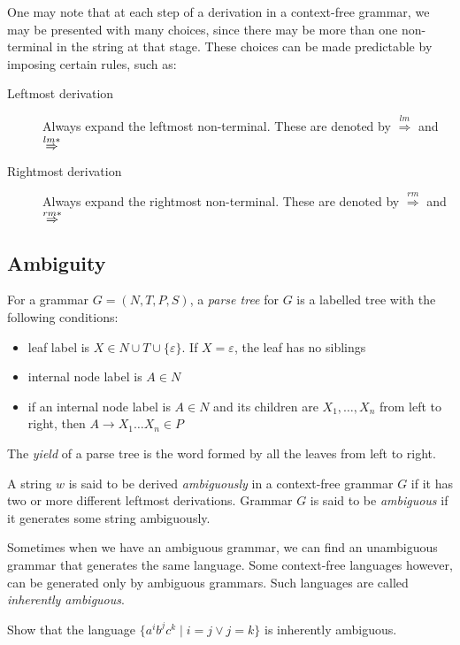 One may note that at each step of a derivation in a context-free grammar, we may be presented with many choices, since there may be more than one non-terminal in the string at that stage. These choices can be made predictable by imposing certain rules, such as:
\begin{description}
    \item[Leftmost derivation] Always expand the leftmost non-terminal. These are denoted by $\overset{lm}{\Rightarrow}$ and $\overset{lm*}{\Rightarrow}$
    \item[Rightmost derivation] Always expand the rightmost non-terminal. These are denoted by $\overset{rm}{\Rightarrow}$ and $\overset{rm*}{\Rightarrow}$
\end{description}

\subsection{Ambiguity}
\begin{definition}
    For a grammar $G = (N, T, P, S)$, a \textit{parse tree} for $G$ is a labelled tree with the following conditions:
    \begin{itemize}
        \item leaf label is $X\in N\cup T\cup\{\varepsilon\}$. If $X = \varepsilon$, the leaf has no siblings 
        \item internal node label is $A\in N$
        \item if an internal node label is $A\in N$ and its children are $X_1,\ldots, X_n$ from left to right, then $A\rightarrow X_1\ldots X_n\in P$
    \end{itemize}
    The \textit{yield} of a parse tree is the word formed by all the leaves from left to right.
\end{definition}

\begin{definition}
    A string $w$ is said to be derived \textit{ambiguously} in a context-free grammar $G$ if it has two or more different leftmost derivations. Grammar $G$ is said to be \textit{ambiguous} if it generates some string ambiguously.
\end{definition}

Sometimes when we have an ambiguous grammar, we can find an unambiguous grammar that generates the same language. Some context-free languages however, can be generated only by ambiguous grammars. Such languages are called \textit{inherently ambiguous}.

\begin{example}
    Show that the language $\{a^ib^jc^k\mid i = j \vee j = k\}$ is inherently ambiguous.
\end{example}

